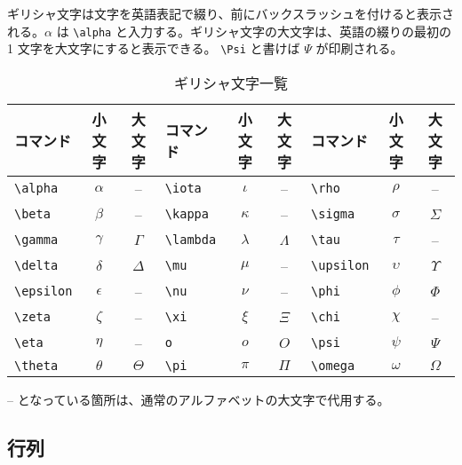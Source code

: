 ギリシャ文字は文字を英語表記で綴り、前にバックスラッシュを付けると表示される。$\alpha$ は \verb|\alpha| と入力する。ギリシャ文字の大文字は、英語の綴りの最初の 1 文字を大文字にすると表示できる。 \verb|\Psi| と書けば $\Psi$ が印刷される。
\begin{table}[H]
  \begin{center}
    \caption{ギリシャ文字一覧}
    \label{tab:greek}
    \begin{tabular}{|lcc|lcc|lcc|}
      \hline
      コマンド & 小文字 & 大文字 & コマンド & 小文字 & 大文字 & コマンド & 小文字 & 大文字 \\
      \hline \hline
      \verb|\alpha| & $\alpha$ & -- & \verb|\iota| & $\iota$ & -- & \verb|\rho| & $\rho$ & -- \\
      \verb|\beta| & $\beta$ & -- & \verb|\kappa| & $\kappa$ & -- & \verb|\sigma| & $\sigma$ & $\Sigma$ \\
      \verb|\gamma| & $\gamma$ & $\Gamma$ & \verb|\lambda| & $\lambda$ & $\Lambda$ & \verb|\tau| & $\tau$ & -- \\
      \verb|\delta| & $\delta$ & $\Delta$ & \verb|\mu| & $\mu$ & -- & \verb|\upsilon| & $\upsilon$ & $\Upsilon$ \\
      \verb|\epsilon| & $\epsilon$ & -- & \verb|\nu| & $\nu$ & -- & \verb|\phi| & $\phi$ & $\Phi$ \\
      \verb|\zeta| & $\zeta$ & -- & \verb|\xi| & $\xi$ & $\Xi$ & \verb|\chi| & $\chi$ & -- \\
      \verb|\eta| & $\eta$ & -- & \verb|o| & $o$ & $O$ & \verb|\psi| & $\psi$ & $\Psi$ \\
      \verb|\theta| & $\theta$ & $\Theta$ & \verb|\pi| & $\pi$ & $\Pi$ & \verb|\omega| & $\omega$ & $\Omega$ \\
      \hline
    \end{tabular}
  \end{center}
\end{table} \noindent
-- となっている箇所は、通常のアルファベットの大文字で代用する。

\subsection{行列}
\label{sec:latex:matrix}

